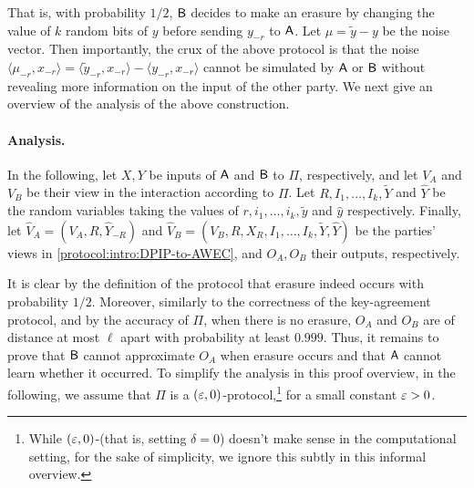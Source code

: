 That is, with probability $1/2$, $\mathsf{B}$ decides to make an erasure by changing the value of $k$ random bits of $y$ before sending $y_{-r}$ to $\mathsf{A}$. Let $\mu=\widetilde{y}-y$ be the noise vector. Then importantly, the crux of the above protocol is that the noise $\langle \mu_{-r}, x_{-r} \rangle = \langle \widetilde{y}_{-r}, x_{-r} \rangle-   \langle y_{-r}, x_{-r} \rangle$ cannot be simulated by $\mathsf{A}$ or $\mathsf{B}$ without revealing more information on the input of the other party. We next give an overview of the analysis of the above construction. 

\paragraph{Analysis.} 
In the following, let $X,Y$ be inputs of $\mathsf{A}$ and $\mathsf{B}$ to $\Pi$, respectively, and let $V_A$ and $V_B$ be their view in the interaction according to $\Pi$.  Let $R, I_1,\dots, I_k, \widetilde{Y}$ and $\widehat{Y}$ be the random variables taking the values of $r,i_1,\dots,i_k,\widetilde{y}$ and $\widehat{y}$ respectively. 
Finally, let $\widehat{V}_A =(V_A, R, \widehat{Y}_{-R})$ and $\widehat{V}_B= (V_B, R, X_R, I_1,\dots, I_k, \widetilde{Y},\widehat{Y})$ be the parties' views in \cref{protocol:intro:DPIP-to-AWEC}, and $O_A,O_B$ their outputs, respectively. 

It is clear by the definition of the protocol that erasure indeed occurs with probability $1/2$. Moreover, similarly to the correctness of the key-agreement protocol, and by the accuracy of $\Pi$, when there is no erasure, $O_A$ and $O_B$ are of distance at most $\ell$ apart with probability at least $0.999$. Thus, it remains to prove that $\mathsf{B}$ cannot approximate $O_A$ when erasure occurs and that $\mathsf{A}$ cannot learn whether it occurred. To simplify the analysis in this proof overview, in the following, we assume that $\Pi$ is a $(\varepsilon,0)$-\CDP protocol,\footnote{While $(\varepsilon,0)$-\CDP (that is, setting $\delta=0$) doesn't make sense in the computational setting, for the sake of simplicity, we ignore this subtly in this informal overview.}  for a small constant $\varepsilon>0$.


